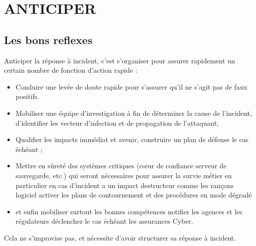 %
%




\section{ANTICIPER}

\subsection{Les bons reflexes}

Anticiper la réponse à incident, c'est s'organiser pour assurer rapidement un certain nombre de fonction d'action rapide :

\begin{itemize}
  \item Conduire une levée de doute rapide pour s'assurer qu'il ne s'agit pas de faux positifs.   \item Mobiliser une équipe d'investigation à fin de déterminer la cause de l'incident, d'identifier les vecteur d'infection et de propagation de l'attaquant,
  \item Qualifier les impacts immédiat et avenir, construire un plan de défense le cas échéant ;
  \item Mettre en sûreté des systèmes critiques (cœur de confiance serveur de sauvegarde, etc.) qui seront nécessaires pour assurer la survie métier en particulier en cas d'incident a un impact destructeur comme les rançons logiciel activer les plans de contournement et des procédures en mode dégradé 
  \item et enfin mobiliser surtout les bonnes compétences notifier les agences et les régulateurs déclencher le cas échéant les assurances Cyber.
\end{itemize}

Cela ne s'improvise pas, et nécessite d'avoir structurer sa réponse à incident.

